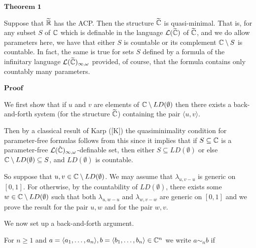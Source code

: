 \documentclass[12pt,nodate]{article}
\begin{document}
\vspace{3mm}

\noindent$\mathbf{Theorem}$ $\mathbf{1}$

\vspace{1mm}

Suppose that $\widetilde{\mathbb{R}}$ has the ACP. Then the structure $\widetilde{\mathbb{C}}$ is quasi-minimal. That is, for any subset $S$ of $\mathbb{C}$ which is definable in the language $\mathcal{L} (\widetilde{\mathbb{C}})$ of $\widetilde{\mathbb{C}}$, and we do allow parameters here, we have that either $S$ is countable or its complement $\mathbb{C} \setminus S$ is countable. In fact, the same is true for sets $S$ defined by a formula of the infinitary language $\mathcal{L} (\widetilde{\mathbb{C}})_{\infty , \omega}$ provided, of course, that the formula contains only countably many parameters.

\vspace{1mm}

\noindent
$\mathbf{Proof}$

\vspace{1mm}

We first show that if $u$ and $v$ are elements of $\mathbb{C} \setminus LD(\emptyset )$ then there exists a back-and-forth system (for the structure $\widetilde{\mathbb{C}}$) containing the pair $\langle u, v \rangle$.

Then by a classical result of Karp ([K]) the quasiminimality condition for parameter-free formulas follows from this since it implies that if $S \subseteq \mathbb{C}$ is a parameter-free $\mathcal{L} (\tilde{\mathbb{C}})_{\infty , \omega }$-definable set, then either $S \subseteq LD(\emptyset)$ or else $\mathbb{C} \setminus LD(\emptyset ) \subseteq S$, and $LD(\emptyset)$ is countable.

So suppose that $u, v \in \mathbb{C} \setminus LD(\emptyset)$. We may assume that $\lambda_{u, v-u}$ is generic on $[0, 1]$.
For otherwise, by the countability of $LD(\emptyset )$, there exists some $w \in \mathbb{C} \setminus LD(\emptyset)$ such that both $\lambda_{u, w-u}$ and 
 $\lambda_{w, v-w}$ are generic on $[0, 1]$ and we prove the result for the pair $u, w$ and for the pair $w, v$.
 
 We now set up a back-and-forth argument. 
 
 \vspace{2mm}
 
 For $n \geq 1$ and $a = \langle a_1 , \ldots , a_n \rangle , b = \langle b_1 , \ldots , b_n \rangle \in \mathbb{C}^{n}$ we write $a \sim_n b$ if
 
 \vspace{2mm}
 
\end{document}
